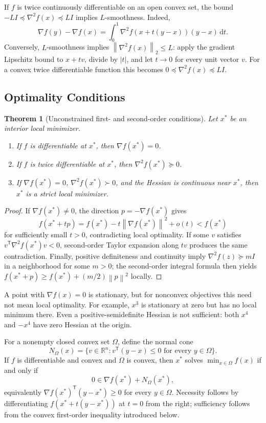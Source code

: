 \documentclass[12pt,oneside]{book}
\numberwithin{equation}{section}
\theoremstyle{definition}
\theoremstyle{plain}
\newtheorem{theorem}{Theorem}[section]
\theoremstyle{remark}
\newcommand{\R}{\mathbb{R}}
\newcommand{\norm}[1]{\left\lVert #1 \right\rVert}
\newcommand{\dd}{\,\mathrm{d}}
\newcommand{\grad}{\nabla}
\newcommand{\Hess}{\nabla^2}
\begin{document}
If $f$ is twice continuously differentiable on an open convex set, the bound
$-LI\preceq\Hess f(x)\preceq LI$ implies $L$-smoothness. Indeed,
\[
 \grad f(y)-\grad f(x)
 =\int_0^1\Hess f(x+t(y-x))(y-x)\dd t.
\]
Conversely, $L$-smoothness implies $\norm{\Hess f(x)}_2\leq L$: apply the
gradient Lipschitz bound to $x+tv$, divide by $|t|$, and let $t\to0$ for every
unit vector $v$. For a convex twice differentiable function this becomes
$0\preceq\Hess f(x)\preceq LI$.

\subsection{Optimality Conditions}

\begin{theorem}[Unconstrained first- and second-order conditions]
Let $x^*$ be an interior local minimizer.
\begin{enumerate}
 \item If $f$ is differentiable at $x^*$, then $\grad f(x^*)=0$.
 \item If $f$ is twice differentiable at $x^*$, then
 $\Hess f(x^*)\succeq0$.
 \item If $\grad f(x^*)=0$, $\Hess f(x^*)\succ0$, and the Hessian is
 continuous near $x^*$, then $x^*$ is a strict local minimizer.
\end{enumerate}
\end{theorem}

\begin{proof}
If $\grad f(x^*)\neq0$, the direction $p=-\grad f(x^*)$ gives
\[
 f(x^*+tp)=f(x^*)-t\norm{\grad f(x^*)}^2+o(t)<f(x^*)
\]
for sufficiently small $t>0$, contradicting local optimality. If some $v$
satisfies $v^\mathsf T\Hess f(x^*)v<0$, second-order Taylor expansion along
$tv$ produces the same contradiction. Finally, positive definiteness and
continuity imply $\Hess f(z)\succeq mI$ in a neighborhood for some $m>0$;
the second-order integral formula then yields
$f(x^*+p)\geq f(x^*)+(m/2)\norm p^2$ locally.
\end{proof}

A point with $\grad f(x)=0$ is stationary, but for nonconvex objectives this
need not mean local optimality. For example, $x^3$ is stationary at zero but
has no local minimum there. Even a positive-semidefinite Hessian is not
sufficient: both $x^4$ and $-x^4$ have zero Hessian at the origin.

For a nonempty closed convex set $\Omega$, define the normal cone
\[
 N_\Omega(x)=\{v\in\R^n:v^\mathsf T(y-x)\leq0
 \text{ for every }y\in\Omega\}.
\]
If $f$ is differentiable and convex and $\Omega$ is convex, then $x^*$ solves
$\min_{x\in\Omega}f(x)$ if and only if
\begin{equation}
 0\in\grad f(x^*)+N_\Omega(x^*),
 \label{eq:normal-cone-optimality}
\end{equation}
equivalently $\grad f(x^*)^\mathsf T(y-x^*)\geq0$ for every $y\in\Omega$.
Necessity follows by differentiating
$f(x^*+t(y-x^*))$ at $t=0$ from the right; sufficiency follows from the convex
first-order inequality introduced below.
\end{document}
